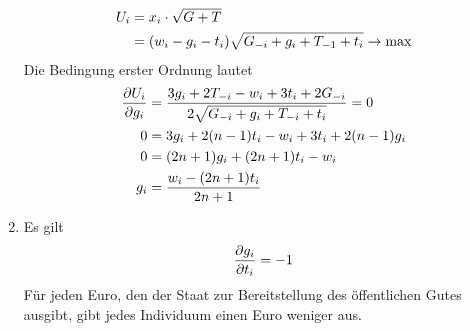 \documentclass{article}
\begin{document}
\begin{enumerate}[label=(\alph*)]
\begin{align}
			U_i &= x_i\cdot\sqrt{G+T} \notag \\
			&= (w_i-g_i-t_i)\sqrt{G_{-i}+g_i + T_{-1} + t_i} \to\max \notag
		\end{align}
		Die Bedingung erster Ordnung lautet
		\begin{align}
			\frac{\partial U_i}{\partial g_i} &= \frac{3g_i + 2T_{-i} - w_i + 3t_i + 2G_{-i}}{2\sqrt{G_{-i}+g_i+T_{-i}+t_i}} = 0 \notag \\
			0 &= 3g_i + 2(n-1)t_i - w_i + 3t_i + 2(n-1)g_i \notag \\
			0 &= (2n+1)g_i + (2n+1)t_i - w_i \notag \\
			g_i &= \frac{w_i-(2n+1)t_i}{2n+1} \notag
		\end{align}
		\item Es gilt
		\begin{align}
			\frac{\partial g_i}{\partial t_i} = -1 \notag
		\end{align}
		Für jeden Euro, den der Staat zur Bereitstellung des öffentlichen Gutes ausgibt, gibt jedes Individuum einen Euro weniger aus.
	\end{enumerate}
	
\end{document}
